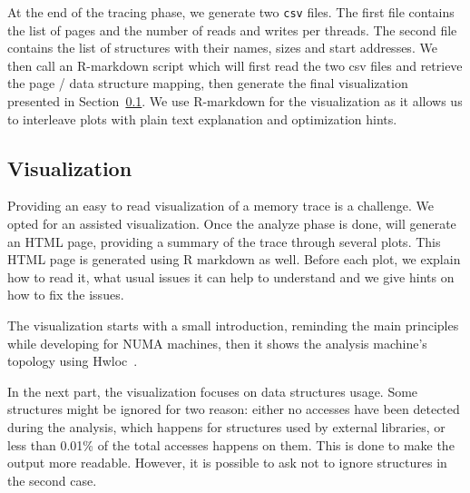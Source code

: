 At the end of the tracing phase, we generate two \texttt{csv} files.
The first file contains the list of pages and the number of reads
and writes per threads. The second file contains the
list of structures with their names, sizes and start addresses.
We then call an R-markdown script which will first read the two csv files and
retrieve the page / data structure mapping, then generate the final
visualization presented in Section~\ref{sec:design-visu}. We use R-markdown
for the visualization as it allows us to interleave plots with plain text
explanation and optimization hints.


\subsection{Visualization}
\label{sec:design-visu}

Providing an easy to read visualization of a memory trace is a challenge. We opted for an
assisted visualization. Once the analyze phase is done, \TABARNAC will
generate an HTML page, providing a summary of the trace through several plots.
This HTML page is generated using R markdown as well.
Before each plot, we explain how to read it, what
usual issues it can help to understand and we give hints on how to fix the issues.

The visualization starts with a small introduction, reminding the main
principles while developing for NUMA machines, then it shows the analysis
machine's topology using Hwloc~\cite{Broquedis10hwloc}.

In the next part, the visualization focuses on data structures usage. Some structures might
be ignored for two reason: either no accesses have been detected during the
analysis, which happens for structures used by external libraries, or less than 0.01\% of the total accesses happens on them. This is done to make the output
more readable. However, it is possible to ask \TABARNAC not to ignore
structures in the second case.


